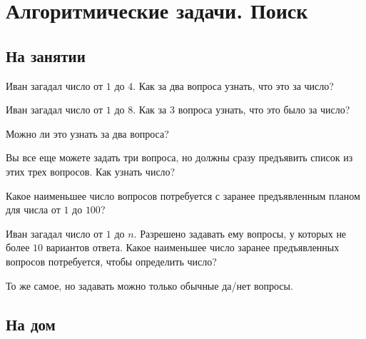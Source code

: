 

\section*{Алгоритмические задачи. Поиск}


\subsection*{На занятии}

\begin{problems}

\item
Иван загадал число от $1$ до $4$.
Как за два вопроса узнать, что это за число?

\item
Иван загадал число от $1$ до $8$.
Как за $3$ вопроса узнать, что это было за число?

\item
Можно ли это узнать за два вопроса?

\item
Вы все еще можете задать три вопроса, но должны сразу предъявить список из этих трех
вопросов.
Как узнать число?

\item
Какое наименьшее число вопросов потребуется с заранее предъявленным планом для числа от
$1$ до $100$?

\item
Иван загадал число от $1$ до $n$.
Разрешено задавать ему вопросы, у которых не более $10$ вариантов ответа.
Какое наименьшее число заранее предъявленных вопросов потребуется, чтобы определить
число?

\item
То же самое, но задавать можно только обычные да/нет вопросы.

\end{problems}


\subsection*{На дом}

